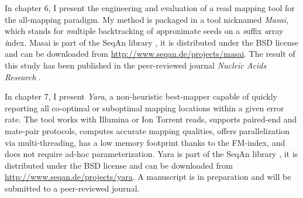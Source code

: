 In chapter 6, I present the engineering and evaluation of a read mapping tool for the all-mapping paradigm.
My method is packaged in a \CC tool nicknamed \emph{Masai}, which stands for \emph{m}ultiple backtracking of \emph{a}pproximate seeds on a \emph{s}uffix \emph{a}rray \emph{i}ndex.
Masai is part of the SeqAn library \citep{Doering2008}, it is distributed under the BSD license and can be downloaded from \url{http://www.seqan.de/projects/masai}.
The result of this study has been published in the peer-reviewed journal \emph{Nucleic Acids Research} \citep{Siragusa2013}.

In chapter 7, I present \emph{Yara}, a non-heuristic best-mapper capable of quickly reporting all co-optimal or suboptimal mapping locations within a given error rate.
The tool works with Illumina or Ion Torrent reads, supports paired-end and mate-pair protocols, computes accurate mapping qualities, offers parallelization via multi-threading, has a low memory footprint thanks to the FM-index, and does not require ad-hoc parameterization.
Yara is part of the SeqAn library \citep{Doering2008}, it is distributed under the BSD license and can be downloaded from \url{http://www.seqan.de/projects/yara}.
A manuscript is in preparation and will be submitted to a peer-reviewed journal.

